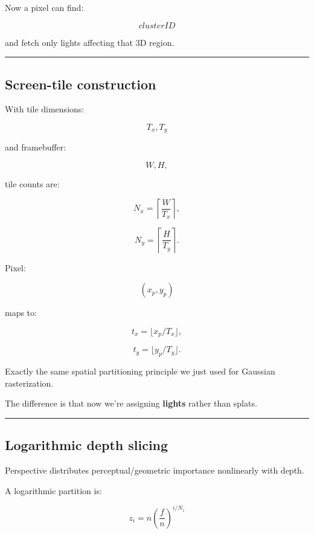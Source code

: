 Now a pixel can find:

\[
clusterID
\]

and fetch only lights affecting that 3D region.

\begin{center}\rule{0.5\linewidth}{0.5pt}\end{center}

\subsection{Screen-tile construction}\label{04-visual-computing-ii-ch040-screen-tile-construction}

\hypertarget{04-visual-computing-ii-ch040-screen-tile-construction}{}

With tile dimensions:

\[
T_x,T_y
\]

and framebuffer:

\[
W,H,
\]

tile counts are:

\[
N_x=
\left\lceil\frac{W}{T_x}\right\rceil,
\]

\[
N_y=
\left\lceil\frac{H}{T_y}\right\rceil.
\]

Pixel:

\[
(x_p,y_p)
\]

maps to:

\[
t_x=
\lfloor x_p/T_x\rfloor,
\]

\[
t_y=
\lfloor y_p/T_y\rfloor.
\]

Exactly the same spatial partitioning principle we just used for Gaussian rasterization.

The difference is that now we're assigning \textbf{lights} rather than splats.

\begin{center}\rule{0.5\linewidth}{0.5pt}\end{center}

\subsection{Logarithmic depth slicing}\label{04-visual-computing-ii-ch040-logarithmic-depth-slicing}

\hypertarget{04-visual-computing-ii-ch040-logarithmic-depth-slicing}{}

Perspective distributes perceptual/geometric importance nonlinearly with depth.

A logarithmic partition is:

\[
\boxed{
z_i
=
n
\left(
\frac fn
\right)^{i/N_z}
}
\]

